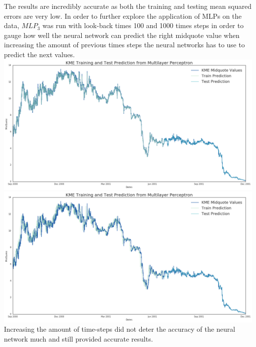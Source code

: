 The results are incredibly accurate as both the training and testing mean squared errors are very low. 
In order to further explore the application of MLPs on the data, $MLP_3$ was run with  look-back times 100 and 1000 times steps in order to gauge how well the neural network can predict the right midquote value when increasing the amount of previous times steps the neural networks has to use to predict the next values. 
\includegraphics[width=\columnwidth]{hidden3lb100}
\includegraphics[width=\columnwidth]{hidden3lb1000}
Increasing the amount of time-steps did not deter the accuracy of the neural network much and still provided accurate results. 

